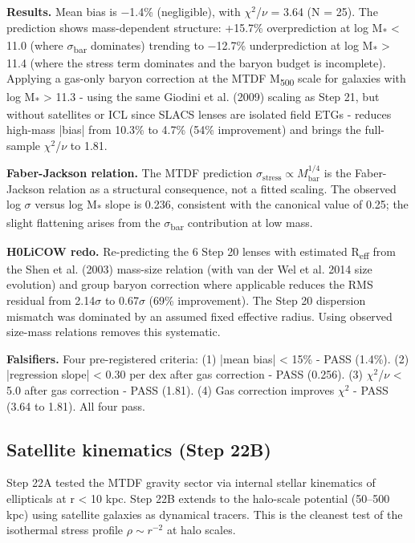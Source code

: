 \documentclass[11pt,a4paper]{article}
\begin{document}
\textbf{Results.} Mean bias is $-$1.4\% (negligible), with $\chi$$^{2}$/$\nu$ = 3.64 (N = 25). The prediction shows mass-dependent structure: +15.7\% overprediction at log M\textsubscript{*} < 11.0 (where $\sigma$\textsubscript{bar} dominates) trending to $-$12.7\% underprediction at log M\textsubscript{*} > 11.4 (where the stress term dominates and the baryon budget is incomplete). Applying a gas-only baryon correction at the MTDF M\textsubscript{500} scale for galaxies with log M\textsubscript{*} > 11.3  -  using the same Giodini et al. (2009) scaling as Step 21, but without satellites or ICL since SLACS lenses are isolated field ETGs  -  reduces high-mass |bias| from 10.3\% to 4.7\% (54\% improvement) and brings the full-sample $\chi$$^{2}$/$\nu$ to 1.81.

\textbf{Faber-Jackson relation.} The MTDF prediction \(\sigma_{\mathrm{stress}} \propto M_{\mathrm{bar}}^{1/4}\) is the Faber-Jackson relation as a structural consequence, not a fitted scaling. The observed log $\sigma$ versus log M\textsubscript{*} slope is 0.236, consistent with the canonical value of 0.25; the slight flattening arises from the $\sigma$\textsubscript{bar} contribution at low mass.

\textbf{H0LiCOW redo.} Re-predicting the 6 Step 20 lenses with estimated R\textsubscript{eff} from the Shen et al. (2003) mass-size relation (with van der Wel et al. 2014 size evolution) and group baryon correction where applicable reduces the RMS residual from 2.14$\sigma$ to 0.67$\sigma$ (69\% improvement). The Step 20 dispersion mismatch was dominated by an assumed fixed effective radius. Using observed size-mass relations removes this systematic.

\textbf{Falsifiers.} Four pre-registered criteria: (1) |mean bias| < 15\%  -  PASS (1.4\%). (2) |regression slope| < 0.30 per dex after gas correction  -  PASS (0.256). (3) $\chi$$^{2}$/$\nu$ < 5.0 after gas correction  -  PASS (1.81). (4) Gas correction improves $\chi$$^{2}$  -  PASS (3.64 to 1.81). All four pass.

\subsection{Satellite kinematics (Step 22B)}
Step 22A tested the MTDF gravity sector via internal stellar kinematics of ellipticals at r < 10 kpc. Step 22B extends to the halo-scale potential (50--500 kpc) using satellite galaxies as dynamical tracers. This is the cleanest test of the isothermal stress profile \(\rho \sim r^{-2}\) at halo scales.
\end{document}
